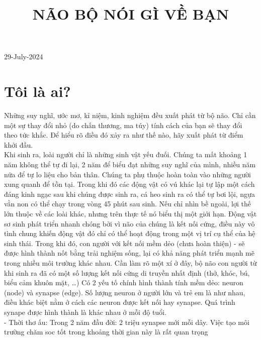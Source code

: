 \documentclass{article}
\title{NÃO BỘ NÓI GÌ VỀ BẠN}
\newcommand\tab[1][1cm]{\hspace*{#1}}
\begin{document}
\maketitle

29-July-2024
\section{Tôi là ai?}

\tab Những suy nghĩ, ước mơ, kỉ niệm, kinh nghiệm đều xuất phát từ bộ não. Chỉ cần một sự thay đổi nhỏ (do chấn thương, ma túy) tính cách của bạn sẽ thay đổi theo tức khắc. Để hiểu rõ điều đó xảy ra như thế nào, hãy xuất phát từ điểm khởi đầu.\\
\tab Khi sinh ra, loài người chỉ là những sinh vật yếu đuối. Chúng ta mất khoảng 1 năm không thể tự đi lại, 2 năm để biểu đạt những suy nghĩ của mình, nhiều năm nữa để tự lo liệu cho bản thân. Chúng ta phụ thuộc hoàn toàn vào những người xung quanh để tồn tại. Trong khi đó các động vật có vú khác lại tự lập một cách đáng kinh ngạc sau khi chúng được sinh ra, cá heo sinh ra có thể tự bơi lội, ngựa vằn non có thể chạy trong vòng 45 phút sau sinh. Nếu chỉ nhìn bề ngoài, lợi thế lớn thuộc về các loài khác, nhưng trên thực tế nó biểu thị một giới hạn. Động vật sơ sinh phát triển nhanh chóng bởi vì não của chúng là kết nối cứng, điều này vô tình chung khiến động vật đó chỉ có thể hoạt động trong một vị trí cụ thể của hệ sinh thái. Trong khi đó, con người với kết nối mềm dẻo (chưa hoàn thiện) - sẽ được hình thành nốt bằng trải nghiệm sống, lại có khả năng phát triển mạnh mẽ trong nhiều môi trường khác nhau. Cần làm rõ một xí ở đây, bộ não con người từ khi sinh ra đã có một số lượng kết nối cứng di truyền nhất định (thở, khóc, bú, biểu cảm khuôn mặt, \dots)
\tab Có 2 yếu tố chính hình thành tính mềm dẻo: neuron (node) và synapse (edge). Số lượng neuron ở người lớn và trẻ em là như nhau, điều khác biệt nằm ở cách các neuron được kết nối hay synapse. Quá trình synape được hình thành là khác nhau ở mỗi độ tuổi.\\
\tab\tab - Thời thơ ấu: Trong 2 năm đầu đời: 2 triệu synapse mới mỗi dây. Việc tạo môi trường chăm soc tốt trong khoảng thời gian này là rất quan trọng \\
\end{document}
